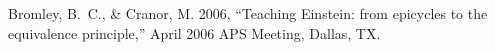 \documentclass[11pt]{article}
\begin{document}





Bromley, B.~C., \& Cranor, M. 2006,
``Teaching Einstein: from epicycles to the equivalence principle,''
April 2006 APS Meeting, Dallas, TX.








\end{document}
